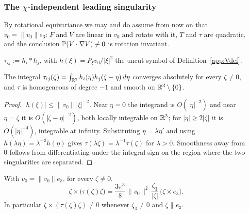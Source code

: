 \subsubsection*{The $\chi$-independent leading singularity}

By rotational equivariance we may and do assume from now on that
$v_0=\|v_0\|e_3$: $F$ and $V$ are linear in $v_0$ and rotate with it,
$T$ and $\tau$ are quadratic, and the conclusion
$\mathbb P(V\cdot\nabla V)\not\equiv0$ is rotation invariant.

\begin{definition}\label{app:tau}
$\tau_{ij}:=h_i*h_j$, with $h(\xi)=P_\xi v_0/|\xi|^2$ the uncut symbol
of Definition~\ref{app:Vdef}.
\end{definition}

\begin{lemma}\label{app:tauwd}
The integral $\tau_{ij}(\zeta)=\int_{\mathbb R^3}h_i(\eta)h_j(\zeta-\eta)\,d\eta$
converges absolutely for every $\zeta\neq0$, and $\tau$ is homogeneous of
degree $-1$ and smooth on $\mathbb R^3\setminus\{0\}$.
\end{lemma}

\begin{proof}
$|h(\xi)|\le\|v_0\||\xi|^{-2}$. Near $\eta=0$ the integrand is
$O(|\eta|^{-2})$ and near $\eta=\zeta$ it is $O(|\zeta-\eta|^{-2})$, both
locally integrable on $\mathbb R^3$; for $|\eta|\ge2|\zeta|$ it is
$O(|\eta|^{-4})$, integrable at infinity. Substituting
$\eta=\lambda\eta'$ and using $h(\lambda\eta)=\lambda^{-2}h(\eta)$ gives
$\tau(\lambda\zeta)=\lambda^{-1}\tau(\zeta)$ for $\lambda>0$. Smoothness
away from $0$ follows from differentiating under the integral sign on
the region where the two singularities are separated.
\end{proof}

\begin{theorem}
\label{app:tauformula}
With $v_0=\|v_0\|e_3$, for every $\zeta\neq0$,
\[
\zeta\times\big(\tau(\zeta)\zeta\big)
=\frac{3\pi^3}{8}\,\|v_0\|^2\,\frac{\zeta_3}{|\zeta|}\,
\big(\zeta\times e_3\big).
\]
In particular $\zeta\times(\tau(\zeta)\zeta)\neq0$ whenever
$\zeta_3\neq0$ and $\zeta\not\parallel e_3$.
\end{theorem}

